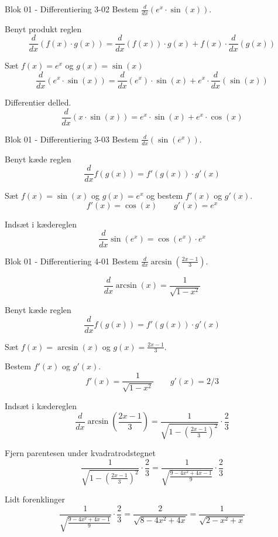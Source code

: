 \documentclass{article}
\begin{document}
\begin{exercise}{Blok 01 - Differentiering 3-02}
Bestem $\frac{d}{dx} \left( e^x \cdot \sin(x) \right)$.


\hint
Benyt produkt reglen
\[
\frac{d}{dx} \left( f(x) \cdot g(x) \right) = \frac{d}{dx} \left( f(x) \right) \cdot g(x) + f(x) \cdot \frac{d}{dx} \left( g(x) \right)
\]

\hint
Sæt $f(x) = e^x$ og $g(x) = \sin(x)$
\[
\frac{d}{dx} \left( e^x \cdot \sin(x) \right) = \frac{d}{dx} \left( e^x \right) \cdot \sin(x) + e^x \cdot \frac{d}{dx} \left( \sin(x) \right)
\]

\hint
Differentier delled.
\[
\frac{d}{dx} \left( x \cdot \sin(x) \right) = e^x \cdot \sin(x) + e^x \cdot \cos(x)
\]
\end{exercise}



\begin{exercise}{Blok 01 - Differentiering 3-03}
Bestem $\frac{d}{dx} \left( \sin(e^x) \right)$.


\hint
Benyt kæde reglen
\[
\frac{d}{dx} f(g(x)) = f'(g(x)) \cdot g'(x)
\]

\hint
Sæt $f(x) = \sin(x)$ og $g(x) = e^x$ og bestem $f'(x)$ og $g'(x)$.
\[
f'(x) = \cos(x) \qquad g'(x) = e^x
\]

\hint
Indsæt i kædereglen
\[
\frac{d}{dx} \sin(e^x) = \cos(e^x) \cdot e^x
\]
\end{exercise}


\begin{exercise}{Blok 01 - Differentiering 4-01}
Bestem $\frac{d}{dx} \arcsin\left( \frac{2x - 1}{3} \right)$.



\hint
\[
\frac{d}{dx} \arcsin(x) = \frac{1}{\sqrt{1 - x^ 2}}
\]


\hint
Benyt kæde reglen
\[
\frac{d}{dx} f(g(x)) = f'(g(x)) \cdot g'(x)
\]

\hint
Sæt $f(x) = \arcsin(x)$ og $g(x) = \frac{2x - 1}{3}$.

\hint
Bestem $f'(x)$ og $g'(x)$.
\[
f'(x) = \frac{1}{\sqrt{1 - x^ 2}} \qquad g'(x) = 2/3
\]

\hint
Indsæt i kædereglen
\[
\frac{d}{dx} \arcsin\left( \frac{2x - 1}{3} \right) = \frac{1}{\sqrt{1 - \left( \frac{2x - 1}{3} \right)^ 2}} \cdot \frac{2}{3}
\]

\hint
Fjern parentesen under kvadratrodstegnet
\[
\frac{1}{\sqrt{1 - \left( \frac{2x - 1}{3} \right)^ 2}} \cdot \frac{2}{3}
= \frac{1}{\sqrt{\frac{9 - 4x^2 + 4x - 1}{9}}} \cdot \frac{2}{3}
\]

\hint
Lidt forenklinger
\[
\frac{1}{\sqrt{\frac{9 - 4x^2 + 4x - 1}{9}}} \cdot \frac{2}{3}
= \frac{2}{\sqrt{8 - 4x^2 + 4x}}
= \frac{1}{\sqrt{2 - x^2 + x}}
\]
\end{exercise}
\end{document}
